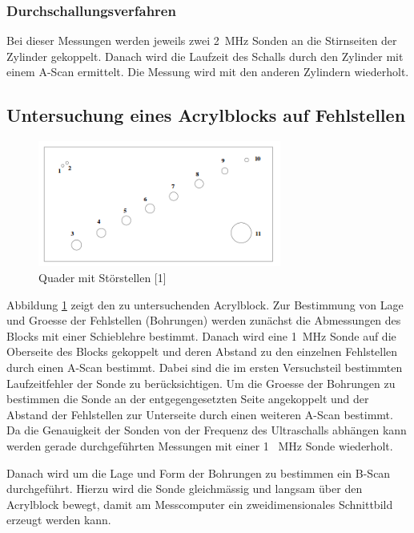 \documentclass[11pt,ngerman,a4paper]{article}
\begin{document}
\subsubsection{Durchschallungsverfahren}
Bei dieser Messungen werden jeweils zwei \SI{2}{\mega\hertz} Sonden an die Stirnseiten der Zylinder gekoppelt. Danach wird die Laufzeit des Schalls durch den Zylinder mit einem A-Scan ermittelt. Die Messung wird mit den anderen Zylindern wiederholt.
\subsection{Untersuchung eines Acrylblocks auf Fehlstellen}
\begin{figure}[h]
\includegraphics[width=8cm]{quaderbild.png}
\caption{Quader mit Störstellen [1]}
\label{block}
\end{figure}
Abbildung \ref{block} zeigt den zu untersuchenden Acrylblock. Zur Bestimmung von Lage und Groesse der Fehlstellen (Bohrungen) werden zun\"achst die Abmessungen des Blocks mit einer Schieblehre bestimmt. Danach wird eine \SI{1}{\mega\hertz} Sonde auf die Oberseite des Blocks gekoppelt und deren Abstand zu den einzelnen Fehlstellen durch einen A-Scan bestimmt. Dabei sind die im ersten Versuchsteil bestimmten Laufzeitfehler der Sonde zu ber\"ucksichtigen. Um die Groesse der Bohrungen zu bestimmen die Sonde an der entgegengesetzten Seite angekoppelt und der Abstand der Fehlstellen zur Unterseite durch einen weiteren A-Scan bestimmt. Da die Genauigkeit der Sonden von der Frequenz des Ultraschalls abh\"angen kann werden gerade durchgef\"uhrten Messungen mit einer 1 \SI{}{\mega\hertz} Sonde wiederholt. 

\noindent
Danach wird um die Lage und Form der Bohrungen zu bestimmen ein B-Scan durchgef\"uhrt. Hierzu wird die Sonde gleichm\"assig und langsam \"uber den Acrylblock bewegt, damit am Messcomputer ein zweidimensionales Schnittbild erzeugt werden kann.
\end{document}
